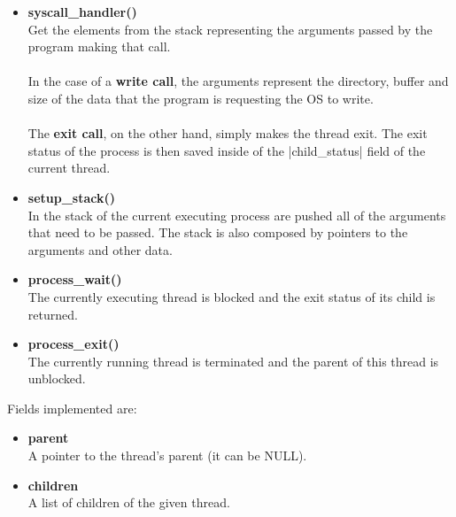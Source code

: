 \documentclass{article}
\begin{document}
\begin{itemize}
	\item \textbf{syscall\_handler()}
	\vspace{.2cm} \\
	Get the elements from the stack representing the arguments passed by the program making that call. \\ \\
	In the case of a \textbf{write call}, the arguments represent the directory, buffer and size of the data that the program is requesting the OS to write. \\ \\
	The \textbf{exit call}, on the other hand, simply makes the thread exit. The exit status of the process is then saved inside of the \cverb|child_status| field of the current thread.
	
	\item \textbf{setup\_stack()}
	\vspace{.2cm} \\
	In the stack of the current executing process are pushed all of the arguments that need to be passed. The stack is also composed by pointers to the arguments and other data.
	
	\item \textbf{process\_wait()}
	\vspace{.2cm} \\
	The currently executing thread is blocked and the exit status of its child is returned.
	
	\item \textbf{process\_exit()}
	\vspace{.2cm} \\
	The currently running thread is terminated and the parent of this thread is unblocked.
\end{itemize}
Fields implemented are:

\begin{itemize}
	\item \textbf{parent}
	\vspace{.2cm} \\
	A pointer to the thread's parent (it can be NULL).
	
	\item \textbf{children}
	\vspace{.2cm} \\
	A list of children of the given thread.
\end{itemize}
\end{document}
